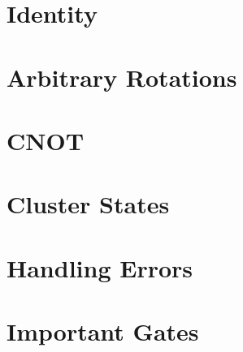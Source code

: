     \section{Identity} %

    \section{Arbitrary Rotations} %

    \section{CNOT} %

    \section{Cluster States} %

    \section{Handling Errors} %

    \section{Important Gates} %
